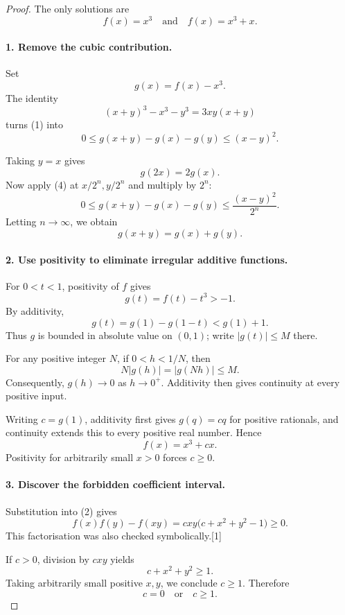 
\begin{dlsummary}[title={\bfseries Solution 67. The Forbidden Coefficient},breakable]

\begin{proof}
The only solutions are
\[
\boxed{f(x)=x^3\quad\text{and}\quad f(x)=x^3+x.}
\]

\paragraph{1. Remove the cubic contribution.}

Set
\[
g(x)=f(x)-x^3.
\]
The identity
\[
(x+y)^3-x^3-y^3=3xy(x+y)
\]
turns (1) into
\[
0\le g(x+y)-g(x)-g(y)\le(x-y)^2. \tag{4}
\]

Taking \(y=x\) gives
\[
g(2x)=2g(x).
\]
Now apply (4) at \(x/2^n,y/2^n\) and multiply by \(2^n\):
\[
0\le g(x+y)-g(x)-g(y)
\le\frac{(x-y)^2}{2^n}.
\]
Letting \(n\to\infty\), we obtain
\[
\boxed{g(x+y)=g(x)+g(y).} \tag{5}
\]

\paragraph{2. Use positivity to eliminate irregular additive functions.}

For \(0<t<1\), positivity of \(f\) gives
\[
g(t)=f(t)-t^3>-1.
\]
By additivity,
\[
g(t)=g(1)-g(1-t)<g(1)+1.
\]
Thus \(g\) is bounded in absolute value on \((0,1)\); write \(|g(t)|\le M\) there.

For any positive integer \(N\), if \(0<h<1/N\), then
\[
N|g(h)|=|g(Nh)|\le M.
\]
Consequently, \(g(h)\to0\) as \(h\to0^+\). Additivity then gives continuity at every positive input.

Writing \(c=g(1)\), additivity first gives \(g(q)=cq\) for positive rationals, and continuity extends this to every positive real number. Hence
\[
\boxed{f(x)=x^3+cx.} \tag{6}
\]
Positivity for arbitrarily small \(x>0\) forces \(c\ge0\).

\paragraph{3. Discover the forbidden coefficient interval.}

Substitution into (2) gives
\[
f(x)f(y)-f(xy)
=cxy\bigl(c+x^2+y^2-1\bigr)\ge0.
\]
This factorisation was also checked symbolically.[1]

If \(c>0\), division by \(cxy\) yields
\[
c+x^2+y^2\ge1.
\]
Taking arbitrarily small positive \(x,y\), we conclude \(c\ge1\). Therefore
\[
\boxed{c=0\quad\text{or}\quad c\ge1.} \tag{7}
\]


\end{proof}
\end{dlsummary}
